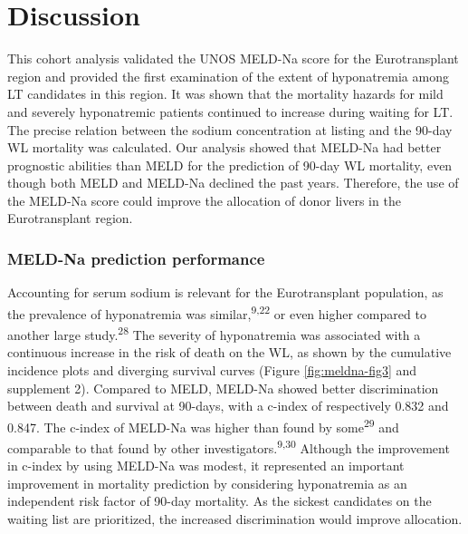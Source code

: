 \documentclass[11pt,english,]{book} %
\begin{document}
\hypertarget{discussion}{%
\section*{Discussion}\label{discussion}}

This cohort analysis validated the UNOS MELD-Na score for the Eurotransplant region and provided the first examination of the extent of hyponatremia among LT candidates in this region. It was shown that the mortality hazards for mild and severely hyponatremic patients continued to increase during waiting for LT. The precise relation between the sodium concentration at listing and the 90-day WL mortality was calculated. Our analysis showed that MELD-Na had better prognostic abilities than MELD for the prediction of 90-day WL mortality, even though both MELD and MELD-Na declined the past years. Therefore, the use of the MELD-Na score could improve the allocation of donor livers in the Eurotransplant region.

\hypertarget{meld-na-prediction-performance}{%
\subsubsection*{MELD-Na prediction performance}\label{meld-na-prediction-performance}}

Accounting for serum sodium is relevant for the Eurotransplant population, as the prevalence of hyponatremia was similar,\textsuperscript{9,22} or even higher compared to another large study.\textsuperscript{28} The severity of hyponatremia was associated with a continuous increase in the risk of death on the WL, as shown by the cumulative incidence plots and diverging survival curves (Figure \ref{fig:meldna-fig3} and supplement 2). Compared to MELD, MELD-Na showed better discrimination between death and survival at 90-days, with a c-index of respectively 0.832 and 0.847. The c-index of MELD-Na was higher than found by some\textsuperscript{29} and comparable to that found by other investigators.\textsuperscript{9,30} Although the improvement in c-index by using MELD-Na was modest, it represented an important improvement in mortality prediction by considering hyponatremia as an independent risk factor of 90-day mortality. As the sickest candidates on the waiting list are prioritized, the increased discrimination would improve allocation.
\end{document}
